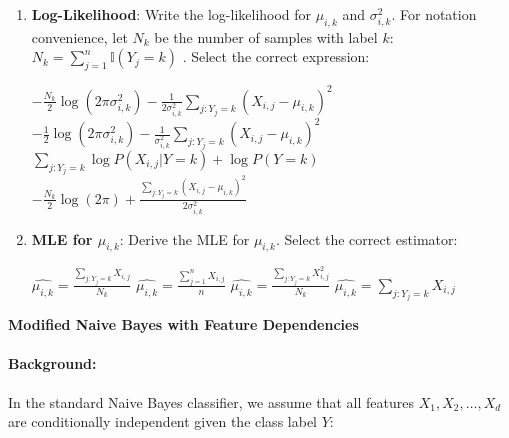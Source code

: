 \documentclass[12pt,letterpaper, onecolumn]{exam}
\begin{document}
\begin{questions}
\begin{enumerate}[label=(\alph*)]
    \item \textbf{Log-Likelihood}: Write the log-likelihood for \( \mu_{i,k} \) and \( \sigma_{i,k}^2 \). For notation convenience, let $N_k$ be the number of samples with label $k$: $N_k = \sum_{j=1}^n \mathbb{I}(Y_j=k)$ . Select the correct expression:
    \begin{choices}
        \choice \( -\frac{N_k}{2} \log(2\pi \sigma_{i,k}^2) - \frac{1}{2\sigma_{i,k}^2} \sum_{j : Y_j=k} (X_{i,j} - \mu_{i,k})^2 \)
        \choice \( -\frac{1}{2} \log(2\pi \sigma_{i,k}^2) - \frac{1}{\sigma_{i,k}^2} \sum_{j : Y_j=k} (X_{i,j} - \mu_{i,k})^2 \)
        \choice \( \sum_{j : Y_j=k} \log P(X_{i,j}|Y=k) + \log P(Y=k) \)
        \choice \( -\frac{N_k}{2} \log(2\pi) + \frac{\sum_{j : Y_j=k} (X_{i,j} - \mu_{i,k})^2}{2\sigma_{i,k}^2} \)
    \end{choices}

    \item \textbf{MLE for \( \mu_{i,k} \)}: Derive the MLE for \( \mu_{i,k} \). Select the correct estimator:
    \begin{choices}
        \choice \( \widehat{\mu_{i,k}} = \frac{\sum_{j : Y_j=k} X_{i,j}}{N_k} \)
        \choice \( \widehat{\mu_{i,k}} = \frac{\sum_{j=1}^n X_{i,j}}{n} \)
        \choice \( \widehat{\mu_{i,k}} = \frac{\sum_{j : Y_j=k} X_{i,j}^2}{N_k} \)
        \choice \( \widehat{\mu_{i,k}} = \sum_{j : Y_j=k} X_{i,j} \)
    \end{choices}
\end{enumerate}

\begin{solution}
    \begin{parts}
        \part
        \part
        \part
    \end{parts}
\end{solution}

\question[20 points]\textbf{Modified Naive Bayes with Feature Dependencies}\droppoints

\paragraph*{Background:}
In the standard Naive Bayes classifier, we assume that all features \( X_1, X_2, \dots, X_d \) are conditionally independent given the class label \( Y \):


\end{questions}
\end{document}
